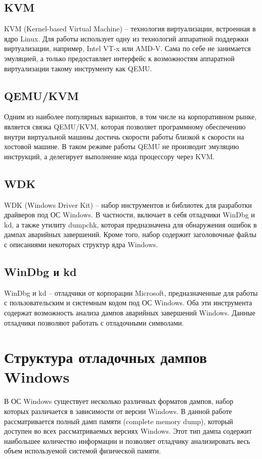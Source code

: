 \documentclass{mipt-thesis-bs}
\begin{document}
\section*{KVM}

KVM (Kernel-based Virtual Machine) -- технология виртуализации, встроенная в ядро Linux. Для работы использует одну из технологий аппаратной поддержки виртуализации, например, Intel VT-x или AMD-V. Сама по себе не занимается эмуляцией, а только предоставляет интерфейс к возможностям аппаратной виртуализации такому инструменту как QEMU.

\section*{QEMU/KVM}
Одним из наиболее популярных вариантов, в том числе на корпоративном рынке, является связка QEMU/KVM, которая позволяет программному обеспечению внутри виртуальной машины достичь скорости работы близкой к скорости на хостовой машине. В таком режиме работы QEMU не производит эмуляцию инструкций, а делегирует выполнение кода процессору через KVM.

\section*{WDK}

WDK (Windows Driver Kit) -- набор инструментов и библиотек для разработки драйверов под ОС Windows. В частности, включает в себя отладчики WinDbg и kd, а также утилиту dumpchk, которая предназначена для обнаружения ошибок в дампах аварийных завершений. Кроме того, набор содержит заголовочные файлы с описаниями некоторых структур ядра Windows.

\section*{WinDbg и kd}

WinDbg и kd -- отладчики от корпорации Microsoft, предназначенные для работы с пользовательским и системным кодом под ОС Windows. Оба эти инструмента содержат возможность анализа дампов аварийных завершений Windows. Данные отладчики позволяют работать с отладочными символами.

\chapter{Структура отладочных дампов Windows}

В ОС Windows существует несколько различных форматов дампов, набор которых различается в зависимости от версии Windows\cite{dumps}. В данной работе рассматривается полный дамп памяти (complete memory dump), который доступен во всех рассматриваемых версиях Windows. Этот тип дампа содержит наибольшее количество информации и позволяет отладчику анализировать весь объем используемой системой физической памяти\cite{completedump}.
\end{document}
